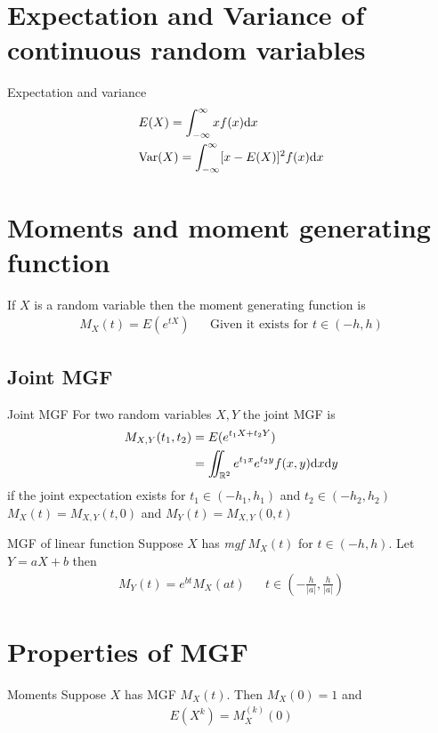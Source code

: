 \documentclass[16pt,a4paper]{article}
\begin{document}
\section{Expectation and Variance of continuous random variables}
\begin{defn}{Expectation and variance}
\begin{align*}
&E(X) = \int_{-\infty}^\infty xf(x) \dd x\\
&\mathrm{Var}(X) = \int_{-\infty}^{\infty} [x-E(X)]^2f(x) \dd x
\end{align*}
\end{defn}
\newpage
\section{Moments and moment generating function}
\begin{defn}{}
If $X$ is a random variable then the moment generating function is 
\begin{align*}
M_X(t) = E(e^{tX}) && \text{Given it exists for $t\in (-h, h)$}
\end{align*} 
\end{defn}
\subsection{Joint MGF}
\begin{defn}{Joint MGF}
For two random variables $X,Y$ the joint MGF is 
\begin{align*}
M_{X,Y}(t_1, t_2) &= E(e^{t_1X + t_2Y})\\
&= \iint_{\mathbb{R}^2} e^{t_1x}e^{t_2y}f(x,y) \dd x \dd y
\end{align*}
if the joint expectation exists for $t_1 \in (-h_1, h_1)$ and $t_2\in (-h_2,h_2)$
$M_X(t) = M_{X,Y}(t,0)$ and $M_Y(t) = M_{X,Y}(0,t)$
\end{defn}
\begin{thm}{MGF of linear function}
Suppose $X$ has \textit{mgf} $M_X(t)$ for $t\in (-h, h)$. Let $Y = aX+b$ then 
\begin{align*}
M_Y(t) = e^{bt}M_X(at) && t \in \left(-\frac{h}{|a|}, \frac{h}{|a|}\right)
\end{align*}
\end{thm}
\newpage
\section{Properties of MGF}
\begin{thm}{Moments}
Suppose $X$ has MGF $M_X(t)$. Then $M_X(0) = 1$ and 
\begin{align*}
E(X^k) = M^{(k)}_X(0)
\end{align*}
\end{thm}
\end{document}
